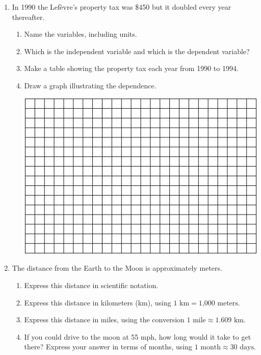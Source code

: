 \documentclass[12pt]{article}
\begin{document}
\begin{enumerate}
\item In 1990 the Lef\`evre's property tax was \$450 but it doubled every year thereafter.  
 \begin{enumerate}
 \item Name the variables, including units. \vfill \vfill
 \item Which is the independent variable and which is the dependent variable? \vfill
\item Make a table showing the property tax each year from 1990 to 1994. \vfill \vfill
\item Draw a graph illustrating the dependence.
\bigskip
\begin{center}
 {\includegraphics [width = 6in] {GraphPaper.jpg}}
\end{center}
\bigskip
 \end{enumerate} 
 
\newpage

\item The distance from the Earth to the Moon is approximately  meters. 
\begin{enumerate}
\item Express this distance in scientific notation. \vfill
\item Express this distance in kilometers (km), using $1 \text{ km} = \text{1,000 meters}$. \vfill
\item Express this distance in miles, using the conversion $1 \text{ mile} \approx 1.609 \text{ km}$. \vfill
\item If you could drive to the moon at 55 mph, how long would it take to get there? Express your answer in terms of months, using $1 \text{ month} \approx 30 \text{ days}$. \vfill
\end{enumerate}



\end{enumerate}
\end{document}
